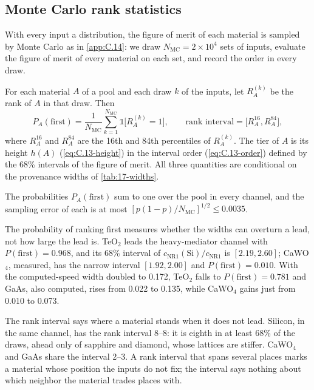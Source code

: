 \subsection{Monte Carlo rank statistics}\label{sec:17.6-mc}

With every input a distribution, the figure of merit of each material is sampled by Monte Carlo as in \cref{app:C.14}: we draw $N_{\mathrm{MC}} = 2\times10^4$ sets of inputs, evaluate the figure of merit of every material on each set, and record the order in every draw.

\begin{keyresult}
For each material $A$ of a pool and each draw $k$ of the inputs, let $R_A^{(k)}$ be the rank of $A$ in that draw. Then
\begin{equation}
  P_A(\mathrm{first}) = \frac{1}{N_{\mathrm{MC}}}\sum_{k=1}^{N_{\mathrm{MC}}}\mathbb{1}\bigl[R_A^{(k)} = 1\bigr] , \qquad
  \text{rank interval} = \bigl[R_A^{16}, R_A^{84}\bigr] ,
  \label{eq:17.6-pfirst}
\end{equation}
where $R_A^{16}$ and $R_A^{84}$ are the 16th and 84th percentiles of $R_A^{(k)}$. The tier of $A$ is its height $h(A)$ (\cref{eq:C.13-height}) in the interval order (\cref{eq:C.13-order}) defined by the 68\% intervals of the figure of merit. All three quantities are conditional on the provenance widths of \cref{tab:17-widths}.
\end{keyresult}

The probabilities $P_A(\mathrm{first})$ sum to one over the pool in every channel, and the sampling error of each is at most $[p(1 - p)/N_{\mathrm{MC}}]^{1/2} \le 0.0035$.

The probability of ranking first measures whether the widths can overturn a lead, not how large the lead is. TeO$_2$ leads the heavy-mediator channel with $P(\mathrm{first}) = 0.968$, and its 68\% interval of $c_{\mathrm{NR1}}(\mathrm{Si})/c_{\mathrm{NR1}}$ is $[2.19, 2.60]$; CaWO$_4$, measured, has the narrow interval $[1.92, 2.00]$ and $P(\mathrm{first}) = 0.010$. With the computed-speed width doubled to 0.172, TeO$_2$ falls to $P(\mathrm{first}) = 0.781$ and GaAs, also computed, rises from 0.022 to 0.135, while CaWO$_4$ gains just from 0.010 to 0.073.

The rank interval says where a material stands when it does not lead. Silicon, in the same channel, has the rank interval 8--8: it is eighth in at least 68\% of the draws, ahead only of sapphire and diamond, whose lattices are stiffer. CaWO$_4$ and GaAs share the interval 2--3. A rank interval that spans several places marks a material whose position the inputs do not fix; the interval says nothing about which neighbor the material trades places with.

